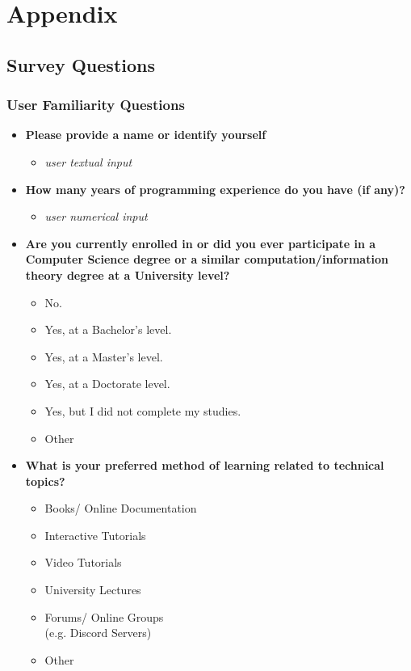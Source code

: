 \chapter{Appendix}
\section{Survey Questions}
%

\subsection{User Familiarity Questions}
\begin{itemize}
	\item  \textbf{Please provide a name or identify yourself}
	      \begin{itemize}
		      \item  \textit{user textual input}

	      \end{itemize}

	\item  \textbf{How many years of programming experience do you have (if any)?}
	      \begin{itemize}
		      \item  \textit{user numerical input}

	      \end{itemize}
	\item  \textbf{Are you currently enrolled in or did you ever participate in a Computer Science degree or a similar computation/information theory degree at a University level?}
	      \begin{itemize}
		      \item  No.
		      \item  Yes, at a Bachelor's level.
		      \item  Yes, at a Master's level.
		      \item  Yes, at a Doctorate level.
		      \item  Yes, but I did not complete my studies.
		      \item  Other
	      \end{itemize}

	\item  \textbf{What is your preferred method of learning related to technical topics?}
	      \begin{itemize}
		      \item Books/ Online Documentation
		      \item Interactive Tutorials
		      \item Video Tutorials
		      \item University Lectures
		      \item Forums/ Online Groups \\(e.g. Discord Servers)
		      \item  Other
	      \end{itemize}


\end{itemize}
